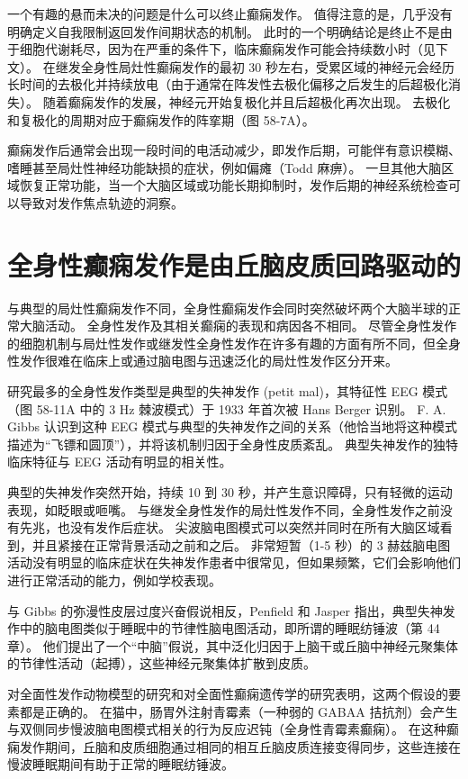 一个有趣的悬而未决的问题是什么可以终止癫痫发作。 值得注意的是，几乎没有明确定义自我限制返回发作间期状态的机制。 此时的一个明确结论是终止不是由于细胞代谢耗尽，因为在严重的条件下，临床癫痫发作可能会持续数小时（见下文）。 在继发全身性局灶性癫痫发作的最初 30 秒左右，受累区域的神经元会经历长时间的去极化并持续放电（由于通常在阵发性去极化偏移之后发生的后超极化消失）。 随着癫痫发作的发展，神经元开始复极化并且后超极化再次出现。 去极化和复极化的周期对应于癫痫发作的阵挛期（图 58-7A）。

癫痫发作后通常会出现一段时间的电活动减少，即发作后期，可能伴有意识模糊、嗜睡甚至局灶性神经功能缺损的症状，例如偏瘫（Todd 麻痹）。 一旦其他大脑区域恢复正常功能，当一个大脑区域或功能长期抑制时，发作后期的神经系统检查可以导致对发作焦点轨迹的洞察。

\section{全身性癫痫发作是由丘脑皮质回路驱动的}

与典型的局灶性癫痫发作不同，全身性癫痫发作会同时突然破坏两个大脑半球的正常大脑活动。 全身性发作及其相关癫痫的表现和病因各不相同。 尽管全身性发作的细胞机制与局灶性发作或继发性全身性发作在许多有趣的方面有所不同，但全身性发作很难在临床上或通过脑电图与迅速泛化的局灶性发作区分开来。

研究最多的全身性发作类型是典型的失神发作 (petit mal)，其特征性 EEG 模式（图 58-11A 中的 3 Hz 棘波模式）于 1933 年首次被 Hans Berger 识别。 F. A. Gibbs 认识到这种 EEG 模式与典型的失神发作之间的关系（他恰当地将这种模式描述为“飞镖和圆顶”），并将该机制归因于全身性皮质紊乱。 典型失神发作的独特临床特征与 EEG 活动有明显的相关性。

典型的失神发作突然开始，持续 10 到 30 秒，并产生意识障碍，只有轻微的运动表现，如眨眼或咂嘴。 与继发全身性发作的局灶性发作不同，全身性发作之前没有先兆，也没有发作后症状。 尖波脑电图模式可以突然并同时在所有大脑区域看到，并且紧接在正常背景活动之前和之后。 非常短暂（1-5 秒）的 3 赫兹脑电图活动没有明显的临床症状在失神发作患者中很常见，但如果频繁，它们会影响他们进行正常活动的能力，例如学校表现。

与 Gibbs 的弥漫性皮层过度兴奋假说相反，Penfield 和 Jasper 指出，典型失神发作中的脑电图类似于睡眠中的节律性脑电图活动，即所谓的睡眠纺锤波（第 44 章）。 他们提出了一个“中脑”假说，其中泛化归因于上脑干或丘脑中神经元聚集体的节律性活动（起搏），这些神经元聚集体扩散到皮质。

对全面性发作动物模型的研究和对全面性癫痫遗传学的研究表明，这两个假设的要素都是正确的。 在猫中，肠胃外注射青霉素（一种弱的 GABAA 拮抗剂）会产生与双侧同步慢波脑电图模式相关的行为反应迟钝（全身性青霉素癫痫）。 在这种癫痫发作期间，丘脑和皮质细胞通过相同的相互丘脑皮质连接变得同步，这些连接在慢波睡眠期间有助于正常的睡眠纺锤波。


